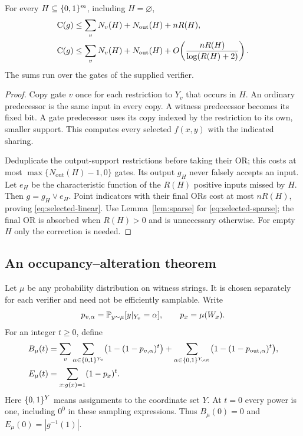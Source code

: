 \begin{lemma}\label{lem:selected}
For every $H\subseteq\{0,1\}^m$, including $H=\varnothing$,
\begin{align}
 \mathrm{C}(g)&\le \sum_v N_v(H)+N_{\mathrm{out}}(H)+nR(H),
       \label{eq:selected-linear}\\
 \mathrm{C}(g)&\le \sum_v N_v(H)+N_{\mathrm{out}}(H)
       +O\!\left(\frac{nR(H)}{\log(R(H)+2)}\right).
       \label{eq:selected-sparse}
\end{align}
The sums run over the gates of the supplied verifier.
\end{lemma}
\begin{proof}
Copy gate $v$ once for each restriction to $Y_v$ that occurs in $H$.
An ordinary predecessor is the same input in every copy. A witness
predecessor becomes its fixed bit. A gate predecessor uses its copy
indexed by the restriction to its own, smaller support. This computes
every selected $f(x,y)$ with the indicated sharing.

Deduplicate the output-support restrictions before taking their OR;
this costs at most $\max\{N_{\mathrm{out}}(H)-1,0\}$ gates. Its
output $g_H$ never falsely accepts an input. Let $e_H$ be the
characteristic function of the $R(H)$ positive inputs missed by $H$.
Then $g=g_H\lor e_H$. Point indicators with their final ORs cost at
most $nR(H)$, proving \eqref{eq:selected-linear}. Use
Lemma~\ref{lem:sparse} for \eqref{eq:selected-sparse}; the final OR
is absorbed when $R(H)>0$ and is unnecessary otherwise. For empty $H$
only the correction is needed.
\end{proof}

\subsection{An occupancy--alteration theorem}\label{sec:occupancy}

Let $\mu$ be any probability distribution on witness strings. It is
chosen separately for each verifier and need not be efficiently
samplable. Write
\[
 p_{v,\alpha}=\mathbb{P}_{y\sim\mu}[y|_{Y_v}=\alpha],
 \qquad p_x=\mu(W_x).
\]
For an integer $t\ge0$, define
\begin{align}
 B_\mu(t)
 &=\sum_v\sum_{\alpha\in\{0,1\}^{Y_v}}
        \bigl(1-(1-p_{v,\alpha})^t\bigr)
   +\sum_{\alpha\in\{0,1\}^{Y_{\mathrm{out}}}}
        \bigl(1-(1-p_{\mathrm{out},\alpha})^t\bigr),
        \label{eq:occupancy-cost}\\
 E_\mu(t)&=\sum_{x:g(x)=1}(1-p_x)^t.
        \label{eq:expected-exceptions}
\end{align}
Here $\{0,1\}^Y$ means assignments to the coordinate set $Y$. At $t=0$
every power is one, including $0^0$ in these sampling expressions.
Thus $B_\mu(0)=0$ and $E_\mu(0)=|g^{-1}(1)|$.

